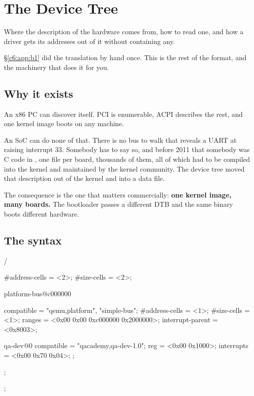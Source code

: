 
\section{The Device Tree}
\label{c10:app:b}

Where the description of the hardware comes from, how to read one, and how a driver gets its
addresses out of it without containing any.

\S\ref{c6:app:b1} did the translation by hand once. This is the rest of the format, and the
machinery that does it for you.

\subsection{Why it exists}
\label{c10:app:b1}

An x86 PC can discover itself. PCI is enumerable, ACPI describes the rest, and one kernel image
boots on any machine.

An SoC can do none of that. There is no bus to walk that reveals a UART at  raising
interrupt 33. Somebody has to say so, and before 2011 that somebody was C code in ,
one file per board, thousands of them, all of which had to be compiled into the kernel and
maintained by the kernel community. The device tree moved that description out of the kernel and
into a data file.

The consequence is the one that matters commercially: \textbf{one kernel image, many boards.} The
bootloader passes a different DTB and the same binary boots different hardware.

\subsection{The syntax}
\label{c10:app:b2}

\begin{console}
/ {
        #address-cells = <2>;
        #size-cells = <2>;

        platform-bus@c000000 {
                compatible = "qemu,platform", "simple-bus";
                #address-cells = <1>;
                #size-cells = <1>;
                ranges = <0x00 0x00 0xc000000 0x2000000>;
                interrupt-parent = <0x8003>;

                qa-dev@0 {
                        compatible = "qacademy,qa-dev-1.0";
                        reg = <0x00 0x1000>;
                        interrupts = <0x00 0x70 0x04>;
                };
        };
};
\end{console}

